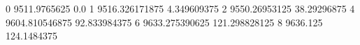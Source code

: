 0 9511.9765625 0.0
1 9516.326171875 4.349609375
2 9550.26953125 38.29296875
4 9604.810546875 92.833984375
6 9633.275390625 121.298828125
8 9636.125 124.1484375
